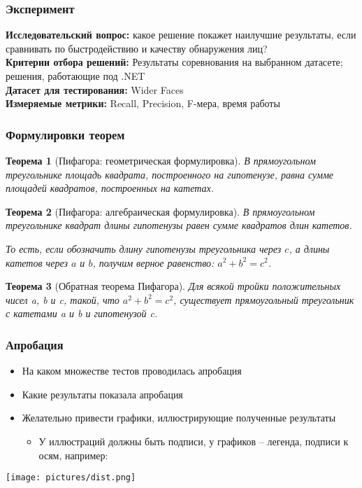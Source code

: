 \documentclass{beamer}
\newtheorem{rutheorem}{Теорема}
\begin{document}
\begin{frame}[fragile]
\transwipe[direction=90]
\frametitle{Эксперимент}
\textbf{Исследовательский вопрос:} какое решение покажет наилучшие результаты, если сравнивать по быстродействию и качеству обнаружения лиц? \\
\textbf{Критерии отбора решений:} Результаты соревнования на выбранном датасете; решения, работающие под .NET \\
\textbf{Датасет для тестирования:} Wider Faces \\
\textbf{Измеряемые метрики:} Recall, Precision, F-мера, время работы 

\end{frame}

\begin{frame}[fragile]
  \transwipe[direction=90]
  \frametitle{Формулировки теорем}
  \begin{rutheorem}[Пифагора: геометрическая формулировка]
    В прямоугольном треугольнике площадь квадрата, построенного на гипотенузе, равна сумме площадей квадратов, построенных на катетах.
  \end{rutheorem}

  \begin{rutheorem}[Пифагора: алгебраическая формулировка]
    В прямоугольном треугольнике квадрат длины гипотенузы равен сумме квадратов длин катетов.    

    То есть, если обозначить длину гипотенузы треугольника через $c$, а длины катетов 
через $a$ и $b$, получим верное равенство: $a^2 + b^2 = c^2$.
  \end{rutheorem}

  \begin{rutheorem}[Обратная теорема Пифагора]
    Для всякой тройки положительных чисел a, b и c, такой, что $a^2 + b^2 = c^2$, существует прямоугольный треугольник с катетами a и b и гипотенузой c.
  \end{rutheorem}  
\end{frame}

\begin{frame}[t]
  \transwipe[direction=90]
  \frametitle{Апробация}
  \begin{itemize}
    \item На каком множестве тестов проводилась апробация
    \item Какие результаты показала апробация
    \item Желательно привести графики, иллюстрирующие полученные результаты
    \begin{itemize}
      \item У иллюстраций должны быть подписи, у графиков -- легенда, подписи к осям, например:
    \end{itemize}
  \end{itemize}
  \texttt{[image: pictures/dist.png]}
\end{frame}
\end{document}
